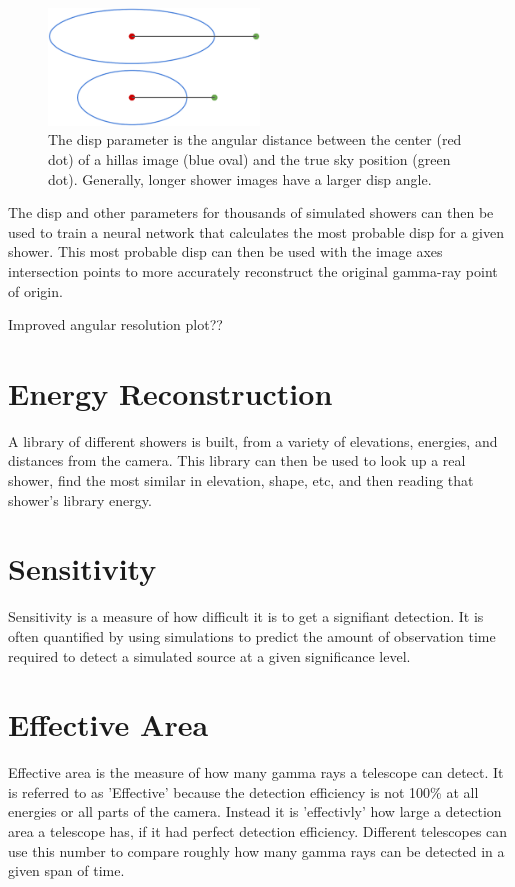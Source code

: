 \begin{figure}[h]
  \begin{center}
    \includegraphics[width=0.5\textwidth]{images/thesis.dispdiagram.eps}
    \caption[Angular Reconstruction Disp]{The disp parameter is the angular distance between the center (red dot) of a hillas image (blue oval) and the true sky position (green dot).  Generally, longer shower images have a larger disp angle.}\label{fig:dispdiagram}
  \end{center}
\end{figure}

The disp and other parameters for thousands of simulated showers can then be used to train a neural network that calculates the most probable disp for a given shower.
This most probable disp can then be used with the image axes intersection points to more accurately reconstruct the original gamma-ray point of origin.

Improved angular resolution plot??

\section{Energy Reconstruction}\label{subsec:enrecon}
A library of different showers is built, from a variety of elevations, energies, and distances from the camera.
This library can then be used to look up a real shower, find the most similar in elevation, shape, etc, and then reading that shower's library energy.


\section{Sensitivity}
Sensitivity is a measure of how difficult it is to get a signifiant detection.
It is often quantified by using simulations to predict the amount of observation time required to detect a simulated source at a given significance level.


\section{Effective Area}
Effective area is the measure of how many gamma rays a telescope can detect.
It is referred to as 'Effective' because the detection efficiency is not 100\% at all energies or all parts of the camera.
Instead it is 'effectivly' how large a detection area a telescope has, if it had perfect detection efficiency.
Different telescopes can use this number to compare roughly how many gamma rays can be detected in a given span of time.


